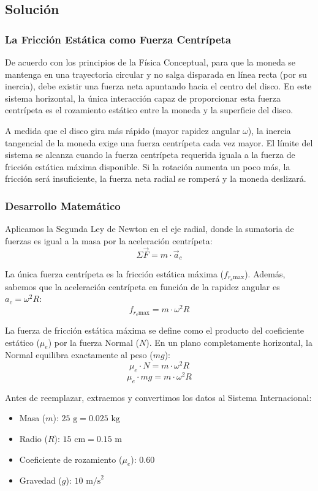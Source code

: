 \documentclass{article}
\begin{document}
\subsection*{Solución}

\subsubsection*{La Fricción Estática como Fuerza Centrípeta}
De acuerdo con los principios de la Física Conceptual, para que la moneda se mantenga en una trayectoria circular y no salga disparada en línea recta (por su inercia), debe existir una fuerza neta apuntando hacia el centro del disco. En este sistema horizontal, la única interacción capaz de proporcionar esta fuerza centrípeta es el rozamiento estático entre la moneda y la superficie del disco. 

A medida que el disco gira más rápido (mayor rapidez angular $\omega$), la inercia tangencial de la moneda exige una fuerza centrípeta cada vez mayor. El límite del sistema se alcanza cuando la fuerza centrípeta requerida iguala a la fuerza de fricción estática máxima disponible. Si la rotación aumenta un poco más, la fricción será insuficiente, la fuerza neta radial se romperá y la moneda deslizará.

\subsubsection*{Desarrollo Matemático}
Aplicamos la Segunda Ley de Newton en el eje radial, donde la sumatoria de fuerzas es igual a la masa por la aceleración centrípeta:
$$\Sigma \vec{F} = m \cdot \vec{a}_c$$

La única fuerza centrípeta es la fricción estática máxima ($f_{r_e \text{max}}$). Además, sabemos que la aceleración centrípeta en función de la rapidez angular es $a_c = \omega^2 R$:
$$f_{r_e \text{max}} = m \cdot \omega^2 R$$

La fuerza de fricción estática máxima se define como el producto del coeficiente estático ($\mu_e$) por la fuerza Normal ($N$). En un plano completamente horizontal, la Normal equilibra exactamente al peso ($mg$):
$$\mu_e \cdot N = m \cdot \omega^2 R$$
$$\mu_e \cdot mg = m \cdot \omega^2 R$$

Antes de reemplazar, extraemos y convertimos los datos al Sistema Internacional:
\begin{itemize}
    \item Masa ($m$): $25 \text{ g} = 0.025 \text{ kg}$
    \item Radio ($R$): $15 \text{ cm} = 0.15 \text{ m}$
    \item Coeficiente de rozamiento ($\mu_e$): $0.60$
    \item Gravedad ($g$): $10 \text{ m/s}^2$
\end{itemize}
\end{document}
